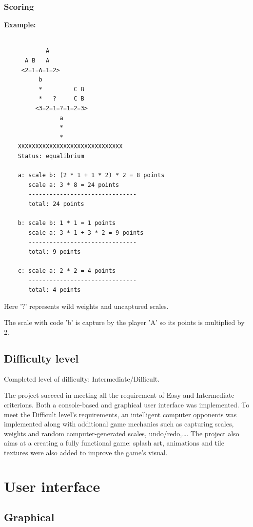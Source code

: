 \documentclass[12pt]{article}
\begin{document}
\subsubsection{Scoring}

\textbf{Example:} 
\begin{verbatim}

            A
      A B   A
     <2=1=A=1=2>
          b          
          *         C B
          *   ?     C B
         <3=2=1=?=1=2=3>
                a
                *
                *
    XXXXXXXXXXXXXXXXXXXXXXXXXXXXXX
    Status: equalibrium 

    a: scale b: (2 * 1 + 1 * 2) * 2 = 8 points 
       scale a: 3 * 8 = 24 points
       -------------------------------
       total: 24 points

    b: scale b: 1 * 1 = 1 points
       scale a: 3 * 1 + 3 * 2 = 9 points
       -------------------------------
       total: 9 points

    c: scale a: 2 * 2 = 4 points
       -------------------------------
       total: 4 points
\end{verbatim}

Here '$?$' represents wild weights and uncaptured scales. 

The scale with code 'b' is capture by the player 'A' so its points is multiplied
by 2.

\subsection{Difficulty level}
Completed level of difficulty: Intermediate/Difficult.

The project succeed in meeting all the requirement of Easy and Intermediate
criterions. Both a console-based and graphical user interface was implemented.
To meet the Difficult level's requirements, an intelligent computer opponents
was implemented along with additional game mechanics such as capturing scales,
weights and random computer-generated scales, undo/redo,\dots. The project also
aims at a creating a fully functional game: splash art, animations and tile
textures were also added to improve the game's visual.

\section{User interface}

\subsection{Graphical}
\end{document}
